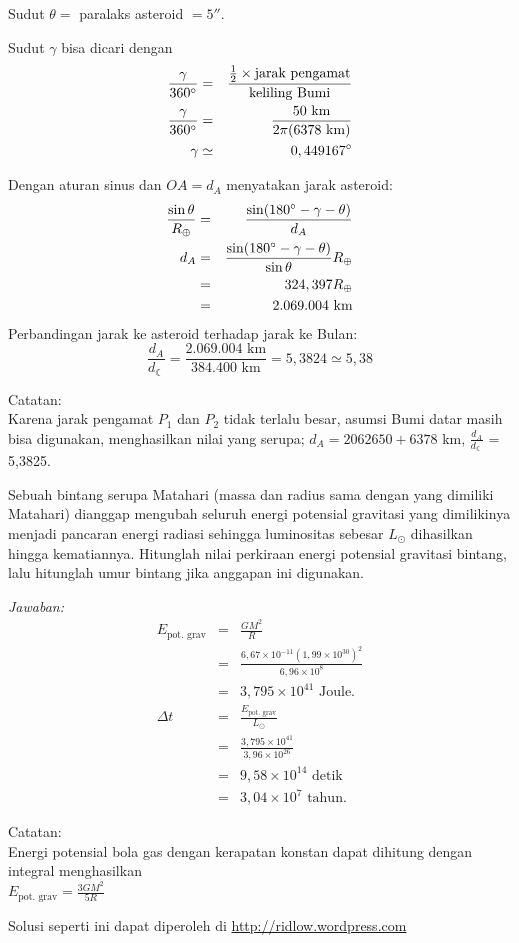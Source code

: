 \documentclass[11pt,fleqn]{exam}
\begin{document}
\begin{questions}
Sudut $\theta=$ paralaks asteroid $=5''$. 

Sudut $\gamma$ bisa dicari dengan
\begin{eqnarray*}
\frac{\gamma}{360\degree} &=& \frac{\frac{1}{2}\times\text{jarak pengamat}}{\text{keliling Bumi}}\\
\frac{\gamma}{360\degree} &=& \frac{50\text{ km}}{2\pi(6378\text{ km})}\\
\gamma &\simeq& 0,449167\degree	
\end{eqnarray*}

Dengan aturan sinus dan $OA=d_A$ menyatakan jarak asteroid:
\begin{eqnarray*}
\frac{\sin \theta}{R_{\oplus}}&=&\frac{\sin(180\degree-\gamma-\theta)}{d_A}\\
d_A&=&\frac{\sin(180\degree-\gamma-\theta)}{\sin \theta}R_{\oplus}\\
&=&324,397R_{\oplus}\\
&=&2.069.004\text{ km}\\
\end{eqnarray*}
Perbandingan jarak ke asteroid terhadap jarak ke Bulan:
\begin{equation}
\frac{d_{A}}{d_{\leftmoon}} = \frac{2.069.004\text{ km}}{384.400\text{ km}} = 5,3824 \simeq 5,38
\end{equation}

Catatan:\\
Karena jarak pengamat $P_1$ dan $P_2$ tidak terlalu besar, asumsi Bumi datar masih bisa digunakan, menghasilkan nilai yang serupa; $d_A = 2062650 + 6378$ km, $\frac{d_{A}}{d_{\leftmoon}}$ = 5,3825.


\question Sebuah bintang serupa Matahari (massa dan radius sama dengan yang dimiliki Matahari) dianggap mengubah seluruh energi potensial gravitasi yang dimilikinya menjadi pancaran energi radiasi sehingga luminositas sebesar $L_{\odot}$ dihasilkan hingga kematiannya. Hitunglah nilai perkiraan energi potensial gravitasi bintang, lalu hitunglah umur bintang jika anggapan ini digunakan.

\textit{Jawaban: }\\
\begin{eqnarray*}
E_\text{pot. grav}&=&\frac{GM^2}{R}\\
&=&\frac{6,67\times 10^{-11}(1,99\times 10^{30})^2}{6,96\times 10^8}\\
&=&3,795\times 10^{41}\text{ Joule}.\\
\Delta t&=&\frac{E_\text{pot. grav}}{L_{\odot}}\\
&=&\frac{3,795\times 10^{41}}{3,96\times 10^{26}}\\
&=&9,58\times 10^{14}\text{ detik}\\
&=&3,04\times 10^7\text{ tahun}.
\end{eqnarray*}

Catatan:\\
Energi potensial bola gas dengan kerapatan konstan dapat dihitung dengan integral menghasilkan\\
$E_\text{pot. grav} = \frac{3 G M^2}{5 R}$


\end{questions}


\vspace{2cm}
\begin{flushright}
Solusi seperti ini dapat diperoleh di \url{http://ridlow.wordpress.com}
\end{flushright}
\end{document}
